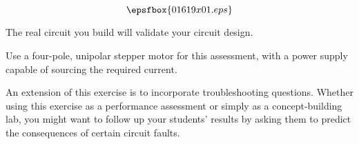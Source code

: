 

$$\epsfbox{01619x01.eps}$$

\vfil \eject






The real circuit you build will validate your circuit design.







Use a four-pole, unipolar stepper motor for this assessment, with a power supply capable of sourcing the required current.

An extension of this exercise is to incorporate troubleshooting questions.  Whether using this exercise as a performance assessment or simply as a concept-building lab, you might want to follow up your students' results by asking them to predict the consequences of certain circuit faults.




